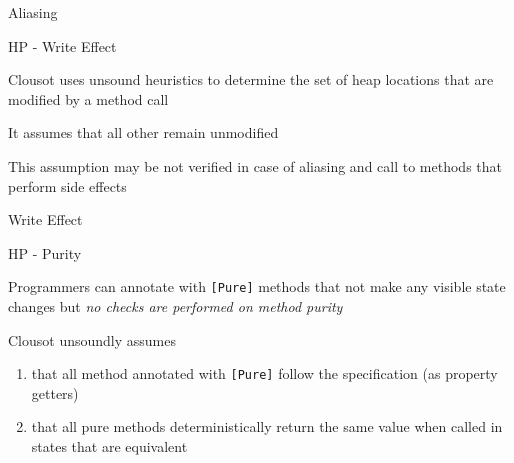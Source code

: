 \begin{frame}[fragile]{Aliasing}
\vspace*{-0.4cm}
\only<1>{}
\end{frame}


\begin{frame}{HP - Write Effect}

\vspace*{-0.6cm}

Clousot uses unsound heuristics to determine the set of heap locations that are
modified by a method call

\vspace*{0.6cm}

It assumes that all other remain unmodified

\vspace*{0.6cm}

This assumption may be not verified in case of aliasing and call to methods
that perform side effects

\end{frame}

\begin{frame}[fragile]{Write Effect}
\vspace*{-0.4cm}
\only<1>{}
\end{frame}


\begin{frame}{HP - Purity}

\vspace*{-0.4cm}

Programmers can annotate with \texttt{[Pure]} methods that not make any visible
state changes but \emph{no checks are performed on method purity}

\vspace*{0.6cm}

Clousot unsoundly assumes
\begin{enumerate}
  \item that all method annotated with \texttt{[Pure]} follow the
  specification (as property getters)
  \item that all pure methods deterministically return the same value when
  called in states that are equivalent
\end{enumerate}

\end{frame}



